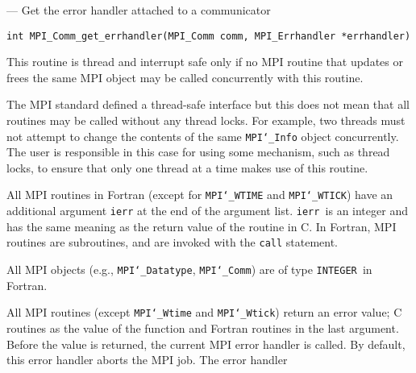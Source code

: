 \startmanpage
{}
--- Get the error handler attached to a communicator 
\startvb\begin{verbatim}
int MPI_Comm_get_errhandler(MPI_Comm comm, MPI_Errhandler *errhandler)

\end{verbatim}
\endvb

\par
{}
\par
\par
{}
\par
This routine is thread and interrupt safe only if no MPI routine that
updates or frees the same MPI object may be called concurrently
with this routine.
\par
The MPI standard defined a thread-safe interface but this does not
mean that all routines may be called without any thread locks.  For
example, two threads must not attempt to change the contents of the
same {\tt MPI{\tt \char`\_}Info} object concurrently.  The user is responsible in this
case for using some mechanism, such as thread locks, to ensure that
only one thread at a time makes use of this routine.
\par
\par
{}
All MPI routines in Fortran (except for {\tt MPI{\tt \char`\_}WTIME} and {\tt MPI{\tt \char`\_}WTICK}) have
an additional argument {\tt ierr} at the end of the argument list.  {\tt ierr
}is an integer and has the same meaning as the return value of the routine
in C.  In Fortran, MPI routines are subroutines, and are invoked with the
{\tt call} statement.
\par
All MPI objects (e.g., {\tt MPI{\tt \char`\_}Datatype}, {\tt MPI{\tt \char`\_}Comm}) are of type {\tt INTEGER
}in Fortran.
\par
{}
\par
All MPI routines (except {\tt MPI{\tt \char`\_}Wtime} and {\tt MPI{\tt \char`\_}Wtick}) return an error value;
C routines as the value of the function and Fortran routines in the last
argument.  Before the value is returned, the current MPI error handler is
called.  By default, this error handler aborts the MPI job.  The error handler
